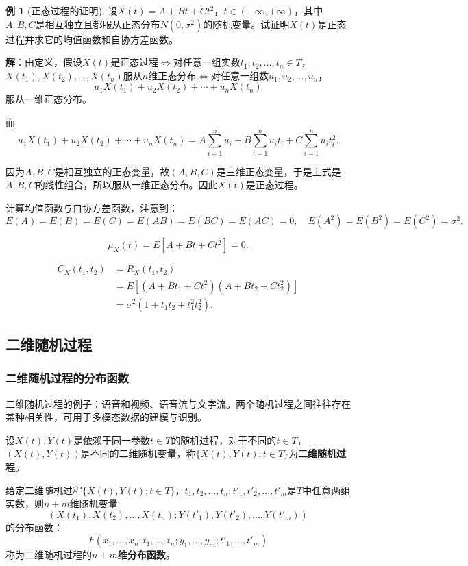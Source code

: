 \documentclass[11pt,a4paper]{report}
\theoremstyle{definition}
\newtheorem{example}{例}[chapter]
\begin{document}
\begin{example}[正态过程的证明]
设$X(t)=A+Bt+Ct^2$，$t\in(-\infty,+\infty)$，其中$A,B,C$是相互独立且都服从正态分布$N(0,\sigma^2)$的随机变量。试证明$X(t)$是正态过程并求它的均值函数和自协方差函数。

\textbf{解}：由定义，假设$X(t)$是正态过程$\iff$对任意一组实数$t_1,t_2,\ldots,t_n\in T$，$X(t_1),X(t_2),\ldots,X(t_n)$服从$n$维正态分布$\iff$对任意一组数$u_1,u_2,\ldots,u_n$，
\[
u_1X(t_1)+u_2X(t_2)+\cdots+u_nX(t_n)
\]
服从一维正态分布。

而
\[
u_1X(t_1)+u_2X(t_2)+\cdots+u_nX(t_n)=A\sum_{i=1}^nu_i+B\sum_{i=1}^nu_it_i+C\sum_{i=1}^nu_it_i^2.
\]

因为$A,B,C$是相互独立的正态变量，故$(A,B,C)$是三维正态变量，于是上式是$A,B,C$的线性组合，所以服从一维正态分布。因此$X(t)$是正态过程。

计算均值函数与自协方差函数，注意到：
\[
E(A)=E(B)=E(C)=E(AB)=E(BC)=E(AC)=0,\quad E(A^2)=E(B^2)=E(C^2)=\sigma^2.
\]

\[
\mu_X(t)=E[A+Bt+Ct^2]=0.
\]

\begin{align*}
C_X(t_1,t_2)&=R_X(t_1,t_2)\\
&=E[(A+Bt_1+Ct_1^2)(A+Bt_2+Ct_2^2)]\\
&=\sigma^2(1+t_1t_2+t_1^2t_2^2).
\end{align*}
\end{example}

\subsection{二维随机过程}

\subsubsection{二维随机过程的分布函数}

二维随机过程的例子：语音和视频、语音流与文字流。两个随机过程之间往往存在某种相关性，可用于多模态数据的建模与识别。

设$X(t),Y(t)$是依赖于同一参数$t\in T$的随机过程，对于不同的$t\in T$，$(X(t),Y(t))$是不同的二维随机变量，称$\{X(t),Y(t);t\in T\}$为\textbf{二维随机过程}。

给定二维随机过程$\{X(t),Y(t);t\in T\}$，$t_1,t_2,\ldots,t_n;t'_1,t'_2,\ldots,t'_m$是$T$中任意两组实数，则$n+m$维随机变量
\[
(X(t_1),X(t_2),\ldots,X(t_n);Y(t'_1),Y(t'_2),\ldots,Y(t'_m))
\]
的分布函数：
\[
F(x_1,\ldots,x_n;t_1,\ldots,t_n;y_1,\ldots,y_m;t'_1,\ldots,t'_m)
\]
称为二维随机过程的\textbf{$n+m$维分布函数}。
\end{document}
